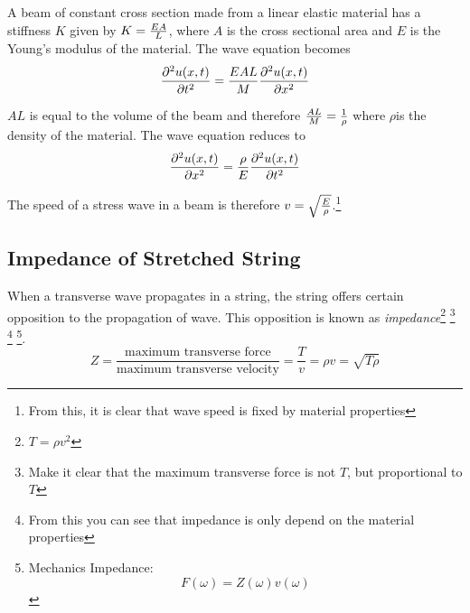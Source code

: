 \documentclass[openany]{book}
\begin{document}
A beam of constant cross section made from a linear elastic material has a stiffness $K$ given by $K= {EA \over L}$, where $A$ is the cross sectional area and $E$ is the Young's modulus of the material. The wave equation becomes
\[{\partial^2 u(x,t) \over \partial t^2}={EAL \over M}{ \partial^2 u(x,t) \over \partial x^2 }\]

$AL$ is equal to the volume of the beam and therefore ${AL \over M}= {1 \over \rho}$ where $\rho$is the density of the material. The wave equation reduces to
\begin{equation}\label{eq:w2}
{ \partial^2 u(x,t) \over \partial x^2 }={ \rho\over E}{\partial^2 u(x,t) \over \partial t^2}
\end{equation}

The speed of a stress wave in a beam is therefore $v=\sqrt{E \over \rho}$.\footnote{From this, it is clear that wave speed is fixed by material properties}

\subsection{Impedance of Stretched String}
When a transverse wave propagates in a string, the string offers certain opposition to the propagation of wave. This opposition is known as \emph{impedance}\footnote{$T=\rho v^2$} \footnote{Make it clear that the maximum transverse force is not $T$, but proportional to $T$} \footnote{From this you can see that impedance is only depend on the material properties} \footnote{Mechanics Impedance: \[F(\omega )=Z(\omega )v(\omega )\]}. 
\[Z=\frac{\text{maximum transverse force}}{\text{maximum transverse velocity}}=\frac{T}{v}=\rho v=\sqrt{T\rho }\]
\end{document}
